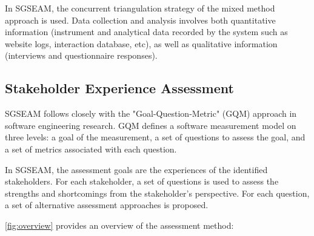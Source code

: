 \documentclass{sigchi}
\begin{document}
In SGSEAM, the concurrent triangulation strategy \cite{creswell2003} of the mixed method approach
is used.  Data collection and analysis involves both quantitative information (instrument and
analytical data recorded by the system such as website logs, interaction database, etc), as well
as qualitative information (interviews and questionnaire responses).

\subsection{Stakeholder Experience Assessment}

SGSEAM follows closely with the "Goal-Question-Metric" (GQM) approach \cite{caldiera1994goal} in
software engineering research. GQM defines a software  measurement model on three levels: a goal
of the measurement, a set of questions to assess the goal, and a set of metrics associated with
each question.

In SGSEAM, the assessment goals are the experiences of the identified stakeholders. For each
stakeholder, a set of questions is used to assess the strengths and shortcomings from the
stakeholder's perspective. For each question, a set of alternative assessment approaches is
proposed.

\autoref{fig:overview} provides an overview of the assessment method:
\end{document}
